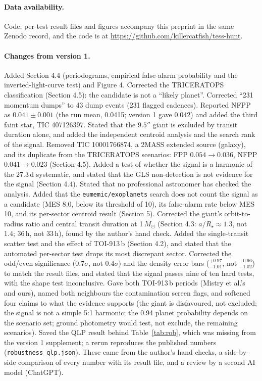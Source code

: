 \documentclass[11pt]{article}
\begin{document}
\paragraph{Data availability.} Code, per-test result files and figures accompany this preprint in the same Zenodo record, and the code is at \url{https://github.com/killercatfish/tess-hunt}.

\paragraph{Changes from version 1.} Added Section 4.4 (periodograms, empirical false-alarm probability and the inverted-light-curve test) and Figure 4. Corrected the \textsc{TRICERATOPS} classification (Section 4.5): the candidate is not a ``likely planet''. Corrected ``231 momentum dumps'' to 43 dump events (231 flagged cadences). Reported NFPP as $0.041\pm0.001$ (the run mean, 0.0415; version 1 gave 0.042) and added the third faint star, TIC 407126397. Stated that the $9.5''$ giant is excluded by transit duration alone, and added the independent centroid analysis and the search rank of the signal. Removed TIC 10001766874, a 2MASS extended source (galaxy), and its duplicate from the \textsc{TRICERATOPS} scenarios: FPP $0.054\to0.036$, NFPP $0.041\to0.023$ (Section 4.5). Added a test of whether the signal is a harmonic of the 27.3\,d systematic, and stated that the GLS non-detection is not evidence for the signal (Section 4.4). Stated that no professional astronomer has checked the analysis. Added that the \texttt{eumemic/exoplanets} search does not count the signal as a candidate (MES 8.0, below its threshold of 10), its false-alarm rate below MES 10, and its per-sector centroid result (Section 5). Corrected the giant's orbit-to-radius ratio and central transit duration at 1\,$M_\odot$ (Section 4.3: $a/R_\star \approx 1.3$, not 1.4; 36\,h, not 33\,h), found by the author's hand check. Added the single-transit scatter test and the effect of TOI-913\,b (Section 4.2), and stated that the automated per-sector test drops its most discrepant sector. Corrected the odd/even significance ($0.7\sigma$, not $0.4\sigma$) and the density error bars ($^{+0.97}_{-1.01}$, not $^{+0.96}_{-1.02}$) to match the result files, and stated that the signal passes nine of ten hard tests, with the shape test inconclusive. Gave both TOI-913\,b periods (Mistry et al.'s and ours), named both neighbours the contamination screen flags, and softened four claims to what the evidence supports (the giant is disfavoured, not excluded; the signal is not a simple 5:1 harmonic; the 0.94 planet probability depends on the scenario set; ground photometry would test, not exclude, the remaining scenarios). Saved the QLP result behind Table~\ref{tab:rob}, which was missing from the version 1 supplement; a rerun reproduces the published numbers (\texttt{robustness\_qlp.json}). These came from the author's hand checks, a side-by-side comparison of every number with its result file, and a review by a second AI model (ChatGPT).
\end{document}
